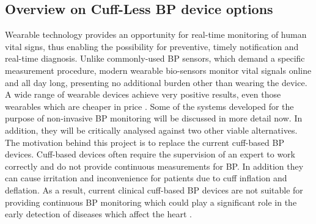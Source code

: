 \subsection{Overview on Cuff-Less BP device options} 
Wearable technology provides an opportunity for real-time monitoring of human vital signs, thus enabling the
 possibility for preventive, timely notification and real-time diagnosis. Unlike commonly-used BP sensors,
  which demand a specific measurement procedure, modern wearable bio-sensors monitor vital signals online and all
   day long, presenting no additional burden other than wearing the device.  A wide range of wearable 
   devices achieve very positive results, even those wearables which are cheaper in price \cite{Simjanoska20182}. Some
    of the systems developed for the purpose of non-invasive BP monitoring will be discussed in more detail now. 
    In addition, they will be critically analysed against two other viable alternatives. \\ \newline \noindent The 
    motivation behind this project is to replace the current cuff-based BP devices. Cuff-based devices often
     require the supervision of an expert to work correctly and do not provide continuous measurements for BP. 
     In addition they can cause irritation and inconvenience for patients due to cuff inflation and deflation. 
     As a result, current clinical cuff-based BP devices are not suitable for providing continuous BP monitoring 
     which could play a significant role in the early detection of diseases which affect the heart \cite{ElHajj2020}.

